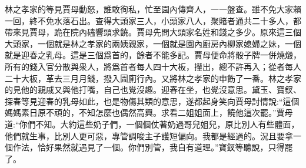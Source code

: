 \begin{parag}
    林之孝家的等見賈母動怒，誰敢徇私，忙至園內傳齊人，一一盤查。雖不免大家賴一回，終不免水落石出。查得大頭家三人，小頭家八人，聚賭者通共二十多人，都帶來見賈母，跪在院內磕響頭求饒。賈母先問大頭家名姓和錢之多少。原來這三個大頭家，一個就是林之孝家的兩姨親家，一個就是園內廚房內柳家媳婦之妹，一個就是迎春之乳母。這是三個爲首的，餘者不能多記。賈母便命將骰子牌一併燒燬，所有的錢入官分散與衆人，將爲首者每人四十大板，攆出，總不許再入；從者每人二十大板，革去三月月錢，撥入圊廁行內。又將林之孝家的申飭了一番。林之孝家的見他的親戚又與他打嘴，自己也覺沒趣。迎春在坐，也覺沒意思。黛玉、寶釵、探春等見迎春的乳母如此，也是物傷其類的意思，遂都起身笑向賈母討情說:“這個媽媽素日原不頑的，不知怎麼也偶然高興。求看二姐姐面上，饒他這次罷。”賈母道:“你們不知。大約這些奶子們，一個個仗著奶過哥兒姐兒，原比別人有些體面，他們就生事，比別人更可惡，專管調唆主子護短偏向。我都是經過的。況且要拿一個作法，恰好果然就遇見了一個。你們別管，我自有道理。”寶釵等聽說，只得罷了。
\end{parag}


